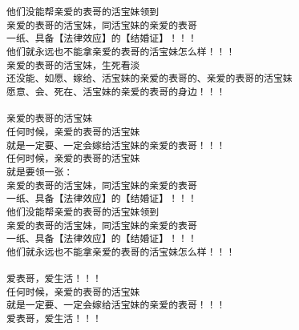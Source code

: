 \documentclass[9pt, b5paper]{article}
\begin{document}
\begin{verbatim}
他们没能帮亲爱的表哥的活宝妹领到
亲爱的表哥的活宝妹，同活宝妹的亲爱的表哥
一纸、具备【法律效应】的【结婚证】！！！
他们就永远也不能拿亲爱的表哥的活宝妹怎么样！！！
亲爱的表哥的活宝妹，生死看淡
还没能、如愿、嫁给、活宝妹的亲爱的表哥的、亲爱的表哥的活宝妹
愿意、会、死在、活宝妹的亲爱的表哥的身边！！！

亲爱的表哥的活宝妹
任何时候，亲爱的表哥的活宝妹
就是一定要、一定会嫁给活宝妹的亲爱的表哥！！！
任何时候，亲爱的表哥的活宝妹
就是要领一张：
亲爱的表哥的活宝妹，同活宝妹的亲爱的表哥
一纸、具备【法律效应】的【结婚证】！！！
他们没能帮亲爱的表哥的活宝妹领到
亲爱的表哥的活宝妹，同活宝妹的亲爱的表哥
一纸、具备【法律效应】的【结婚证】！！！
他们就永远也不能拿亲爱的表哥的活宝妹怎么样！！！

爱表哥，爱生活！！！
任何时候，亲爱的表哥的活宝妹
就是一定要、一定会嫁给活宝妹的亲爱的表哥！！！
爱表哥，爱生活！！！
\end{verbatim}
\end{document}
